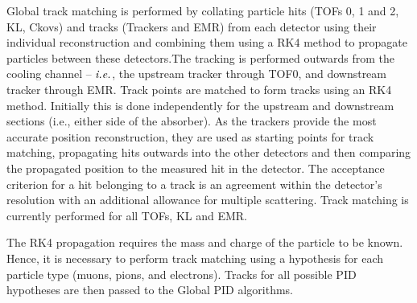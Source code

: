 \documentclass[11pt]{article}
\begin{document}
Global track matching is performed by collating particle hits (TOFs 0, 1 and 2, KL, Ckovs) and tracks (Trackers and EMR) from each detector using their individual reconstruction and combining them using a RK4 method to propagate particles between these detectors.The tracking is performed outwards from the cooling channel -- $\emph{i.e.}$, the upstream tracker through TOF0, and downstream tracker through EMR.
%
Track points are matched to form tracks using an RK4 method. Initially this is done independently for the upstream and downstream sections (i.e., either side of the absorber). As the trackers provide the most accurate position reconstruction, they are used as starting points for track matching, propagating hits outwards into the other detectors and then comparing the propagated position to the measured hit in the detector. The acceptance criterion for a hit belonging to a track is an agreement within the detector's resolution with an additional allowance for multiple scattering.  Track matching is currently performed for all TOFs, KL and EMR. 

The RK4 propagation requires the mass and charge of the particle to be known. Hence, it is necessary to perform track matching using a hypothesis for each particle type (muons, pions, and electrons). Tracks for all possible PID hypotheses are then passed to the Global PID algorithms. 

%

\end{document}
